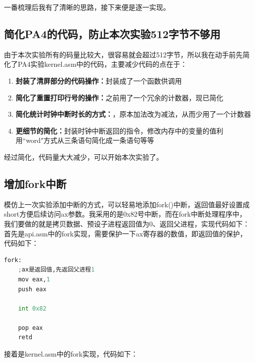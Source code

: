 \documentclass{LabReport}
\begin{document}
	一番梳理后我有了清晰的思路，接下来便是逐一实现。

	\subsection{简化PA4的代码，防止本次实验512字节不够用}
	由于本次实验所有的码量比较大，很容易就会超过512字节，所以我在动手前先简化了PA4实验kernel.asm中的代码，主要减少代码的点在于：
	\begin{enumerate}
		\item \textbf{封装了清屏部分的代码操作：}封装成了一个函数供调用
		\item \textbf{简化了重置打印行号的操作：}之前用了一个冗余的计数器，现已简化
		\item \textbf{简化统计时钟中断时长的方式：}，原本加法改为减法，从而少用了一个计数器
		\item \textbf{更细节的简化：}封装时钟中断返回的指令，修改内存中的变量的值利用``word"方式从三条语句简化成一条语句等等
	\end{enumerate}
	
	经过简化，代码量大大减少，可以开始本次实验了。
	
	\subsection{增加fork中断}
	模仿上一次实验添加中断的方式，可以轻易地添加fork()中断，返回值最好设置成short方便后续访问ax参数。我采用的是0x82号中断，而在fork中断处理程序中，我们要做的就是拷贝数据、预设子进程返回值为0、返回父进程，实现代码如下：\\
	
	首先是api.asm中的fork实现，需要保护一下ax寄存器的数值，即返回值的保护，代码如下：
	
\begin{lstlisting}[language=python,frame=shadowbox]
fork:
	;ax是返回值,先返回父进程1
	mov eax,1
	push eax
	
	int 0x82
	
	pop eax
	retd
\end{lstlisting}

	接着是kernel.asm中的fork实现，代码如下：
	
\end{document}
